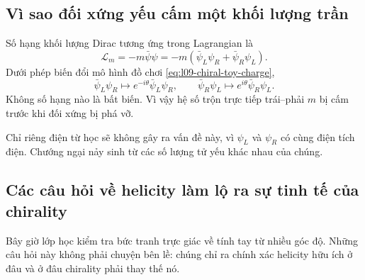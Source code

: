 \subsection{Vì sao đối xứng yếu cấm một khối lượng trần}

Số hạng khối lượng Dirac tương ứng trong Lagrangian là
\begin{equation}
  \mathcal L_m
  =-m\bar\psi\psi
  =-m\left(\bar\psi_L\psi_R+\bar\psi_R\psi_L\right).
  \label{eq:l09-bare-dirac-mass}
\end{equation}
Dưới phép biến đổi mô hình đồ chơi \eqref{eq:l09-chiral-toy-charge},
\begin{equation}
  \bar\psi_L\psi_R\longmapsto
  e^{-i\theta}\bar\psi_L\psi_R,
  \qquad
  \bar\psi_R\psi_L\longmapsto
  e^{i\theta}\bar\psi_R\psi_L.
\end{equation}
Không số hạng nào là bất biến. Vì vậy hệ số trộn trực tiếp trái--phải \(m\) bị cấm trước khi đối xứng bị phá vỡ.

Chỉ riêng điện từ học sẽ không gây ra vấn đề này, vì \(\psi_L\) và
\(\psi_R\) có cùng điện tích điện. Chướng ngại nảy sinh từ các số lượng tử yếu khác nhau của chúng.

\subsection{Các câu hỏi về helicity làm lộ ra sự tinh tế của chirality}

Bây giờ lớp học kiểm tra bức tranh trực giác về tính tay từ nhiều góc độ. Những câu hỏi này không phải chuyện bên lề: chúng chỉ ra chính xác helicity hữu ích ở đâu và ở đâu chirality phải thay thế nó.

\begin{classroomqa}
\end{classroomqa}

\begin{classroomqa}
\end{classroomqa}

